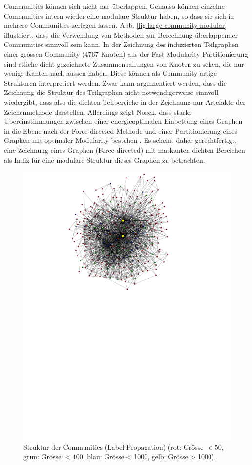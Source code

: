 Communities k\"onnen sich nicht nur \"uberlappen. Genauso k\"onnen
einzelne Communities intern wieder eine modulare Struktur haben, so
dass sie sich in mehrere Communities zerlegen lassen.
Abb. \ref{fig:large-community-modular} illustriert, dass die
Verwendung von Methoden zur Berechnung \"uberlappender Communities
sinnvoll sein kann. In der Zeichnung des induzierten Teilgraphen einer
grossen Community (4767 Knoten) aus der
Fast-Modularity-Partitionierung sind etliche dicht gezeichnete
Zusammenballungen von Knoten zu sehen, die nur wenige Kanten nach
aussen haben. Diese k\"onnen als Community-artige Strukturen
interpretiert werden. Zwar kann argumentiert werden, dass die
Zeichnung die Struktur des Teilgraphen nicht notwendigerweise sinnvoll
wiedergibt, dass also die dichten Teilbereiche in der Zeichnung nur
Artefakte der Zeichenmethode darstellen. Allerdings zeigt Noack, dass
starke \"Ubereinstimmungen zwischen einer energieoptimalen Einbettung
eines Graphen in die Ebene nach der Force-directed-Methode und einer
Partitionierung eines Graphen mit optimaler Modularity bestehen
\cite{Noack2009}. Es scheint daher gerechtfertigt, eine Zeichnung
eines Graphen (Force-directed) mit markanten dichten Bereichen als
Indiz f\"ur eine modulare Struktur dieses Graphen zu betrachten.
\begin{figure}[h]
  \centering
  \includegraphics[scale=1.5]{images/label-prop-metagraph-20-narrow-cut.pdf}
  \caption{Struktur der Communities (Label-Propagation) (rot: Gr\"osse
    $<50$, gr\"un: Gr\"osse $<100$, blau: Gr\"osse < 1000, gelb:
    Gr\"osse > 1000).}
  \label{fig:metagraph-com-label}
\end{figure}

